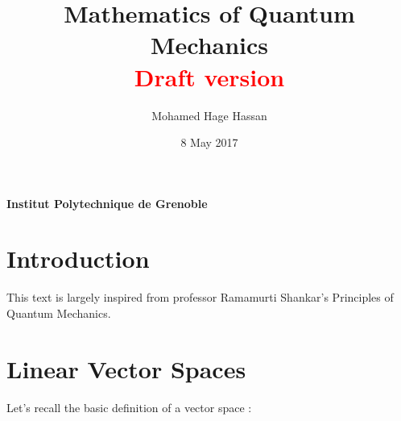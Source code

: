 \documentclass[11pt]{article}
\newtheorem{theorem}{Theorem}[section]
\theoremstyle{definition}
\numberwithin{equation}{section}
\begin{document}
\title{\textbf{Mathematics of Quantum Mechanics} \\ \textbf{\textcolor{red}{Draft version}} }
\author{Mohamed Hage Hassan}
\date{8 May 2017}
\maketitle
\thispagestyle{empty}

\begin{abstract}
     
\end{abstract}

\vskip 9.5cm
\begin{center} \textbf{Institut Polytechnique de Grenoble} \end{center}

\clearpage
\tableofcontents

\clearpage

\section*{Introduction}

This text is largely inspired from professor Ramamurti Shankar's Principles of Quantum Mechanics\cite{Principles of Quantum Mechanics}.

\section{Linear Vector Spaces}

Let's recall the basic definition of a vector space : 
\medskip
\iffalse
\begin{theorem}
Let $f$ be a function whose derivative exists in every point, then $f$ is 
a continuous function.
\end{theorem}
\fi
\end{document}

